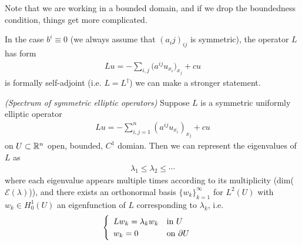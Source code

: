\documentclass[12pt,a4paper]{report}
\begin{document}
Note that we are working in a bounded domain, and if we drop the boundedness condition, things get more complicated.
\s

In the case $b^i \equiv 0$ (we always assume that $(a_ij)_{ij}$ is symmetric), the operator $L$ has form
\begin{align*}
Lu = -\sum_{i,j} \big( a^{ij}u_{x_i} \big)_{x_j} + cu
\end{align*}
is formally self-adjoint (i.e. $L = L^{\dagger}$) we can make a stronger statement.
\s

\thm \emph{(Spectrum of symmetric elliptic operators)} Suppose $L$ is a symmetric uniformly elliptic operator
\begin{align*}
Lu = -\sum_{i,j=1}^n (a^{ij}u_{x_i})_{x_j} + cu
\end{align*}
on $U \subset \mathbb{R}^n$ open, bounded, $C^1$ domian. Then we can represent the eigenvalues of $L$ as
\begin{align*}
\lambda_1 \leq \lambda_2 \leq \cdots
\end{align*}
where each eigenvalue appears multiple times according to its multiplicity (dim($\mathscr{E}(\lambda)$)), and there exists an orthonormal basis $\{w_k \}_{k=1}^{\infty}$ for $L^2(U)$ with $w_k \in H_0^1(U)$ an eigenfunction of $L$ corresponding to $\lambda_k$, i.e.
\begin{align*}
\begin{cases}
\begin{array}{ll}
Lw_k = \lambda_k w_k & \text{in } U \\
w_k = 0 & \text{on } \partial U
\end{array}
\end{cases}
\end{align*}
\end{document}
